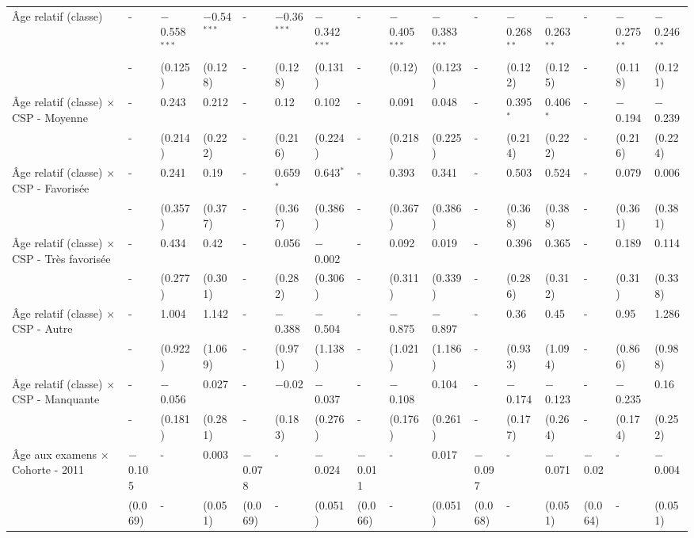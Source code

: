 \documentclass[
]{book}
\begin{document}
\begin{ThreePartTable}
\begin{longtable}[t]{llllllllllllllll}
Âge relatif (classe) & - & $-$0.558$^{***}$ & $-$0.54$^{***}$ & - & $-$0.36$^{***}$ & $-$0.342$^{***}$ & - & $-$0.405$^{***}$ & $-$0.383$^{***}$ & - & $-$0.268$^{**}$ & $-$0.263$^{**}$ & - & $-$0.275$^{**}$ & $-$0.246$^{**}$\\
 & - & (0.125) & (0.128) & - & (0.128) & (0.131) & - & (0.12) & (0.123) & - & (0.122) & (0.125) & - & (0.118) & (0.121)\\
Âge relatif (classe) $\times$ CSP - Moyenne & - & 0.243 & 0.212 & - & 0.12 & 0.102 & - & 0.091 & 0.048 & - & 0.395$^{*}$ & 0.406$^{*}$ & - & $-$0.194 & $-$0.239\\
 & - & (0.214) & (0.222) & - & (0.216) & (0.224) & - & (0.218) & (0.225) & - & (0.214) & (0.222) & - & (0.216) & (0.224)\\
Âge relatif (classe) $\times$ CSP - Favorisée & - & 0.241 & 0.19 & - & 0.659$^{*}$ & 0.643$^{*}$ & - & 0.393 & 0.341 & - & 0.503 & 0.524 & - & 0.079 & 0.006\\
 & - & (0.357) & (0.377) & - & (0.367) & (0.386) & - & (0.367) & (0.386) & - & (0.368) & (0.388) & - & (0.361) & (0.381)\\
Âge relatif (classe) $\times$ CSP - Très favorisée & - & 0.434 & 0.42 & - & 0.056 & $-$0.002 & - & 0.092 & 0.019 & - & 0.396 & 0.365 & - & 0.189 & 0.114\\
 & - & (0.277) & (0.301) & - & (0.282) & (0.306) & - & (0.311) & (0.339) & - & (0.286) & (0.312) & - & (0.31) & (0.338)\\
Âge relatif (classe) $\times$ CSP - Autre & - & 1.004 & 1.142 & - & $-$0.388 & $-$0.504 & - & $-$0.875 & $-$0.897 & - & 0.36 & 0.45 & - & 0.95 & 1.286\\
 & - & (0.922) & (1.069) & - & (0.971) & (1.138) & - & (1.021) & (1.186) & - & (0.933) & (1.094) & - & (0.866) & (0.988)\\
Âge relatif (classe) $\times$ CSP - Manquante & - & $-$0.056 & 0.027 & - & $-$0.02 & $-$0.037 & - & $-$0.108 & 0.104 & - & $-$0.174 & $-$0.123 & - & $-$0.235 & 0.16\\
 & - & (0.181) & (0.281) & - & (0.183) & (0.276) & - & (0.176) & (0.261) & - & (0.177) & (0.264) & - & (0.174) & (0.252)\\
Âge aux examens $\times$ Cohorte - 2011 & $-$0.105 & - & 0.003 & $-$0.078 & - & $-$0.024 & $-$0.011 & - & 0.017 & $-$0.097 & - & $-$0.071 & $-$0.02 & - & $-$0.004\\
 & (0.069) & - & (0.051) & (0.069) & - & (0.051) & (0.066) & - & (0.051) & (0.068) & - & (0.051) & (0.064) & - & (0.051)\\

\end{longtable}
\end{ThreePartTable}
\end{document}
